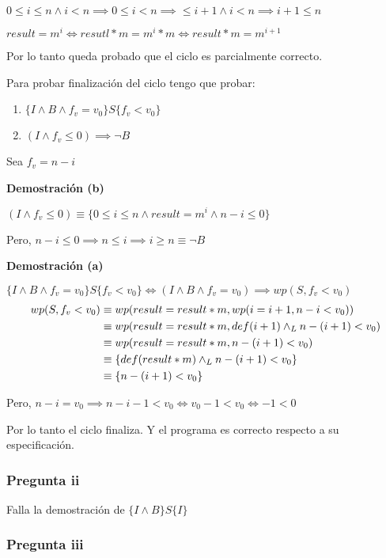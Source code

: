 $ 0 \leq i \leq n \wedge i < n \implies 0 \leq i < n \implies   \leq i+1 \wedge i<n \implies i+1 \leq n$

$ result = m^i \iff resutl * m = m^i * m \iff result * m = m^{i+1} $

Por lo tanto queda probado que el ciclo es parcialmente correcto.

Para probar finalización del ciclo tengo que probar:
\begin{enumerate}[label=(\alph*)]
    \item $ \{ I \wedge B \wedge f_v = v_0 \} S \{ f_v < v_0 \} $
    \item $ (I \wedge f_v \leq 0) \implies \neg B $
\end{enumerate}

Sea $ f_v = n-i $

\textbf{Demostración (b)}

$ (I \wedge f_v \leq 0) \equiv \{ 0 \leq i \leq n \wedge result = m^i \wedge n-i \leq 0 \} $

Pero, $ n-i \leq 0 \implies n \leq i \implies i \geq n \equiv \neg B $

\textbf{Demostración (a)}

$ \{ I \wedge B \wedge f_v = v_0 \} S \{ f_v < v_0 \} \iff (I \wedge B \wedge f_v = v_0) \implies wp(S, f_v < v_0) $ 
\begin{align*}
    wp(S,f_v < v_0) &\equiv wp(result = result * m, wp(i= i+1, n-i < v_0)) \\
    &\equiv wp(result = result * m, def(i+1) \land _L n-(i+1) < v_0) \\
    &\equiv wp(result = result * m, n-(i+1) < v_0) \\
    &\equiv \{ def(result * m) \land _L n-(i+1) < v_0 \} \\
    &\equiv \{ n-(i+1) < v_0 \} \\
\end{align*}

Pero, $ n-i = v_0 \implies n-i-1 < v_0 \iff v_0 - 1 < v_0 \iff -1 < 0 $

Por lo tanto el ciclo finaliza. Y el programa es correcto respecto a su especificación.

\subsubsection{Pregunta ii}

Falla la demostración de $ \{ I \wedge B \}S\{ I \} $

\subsubsection{Pregunta iii}

